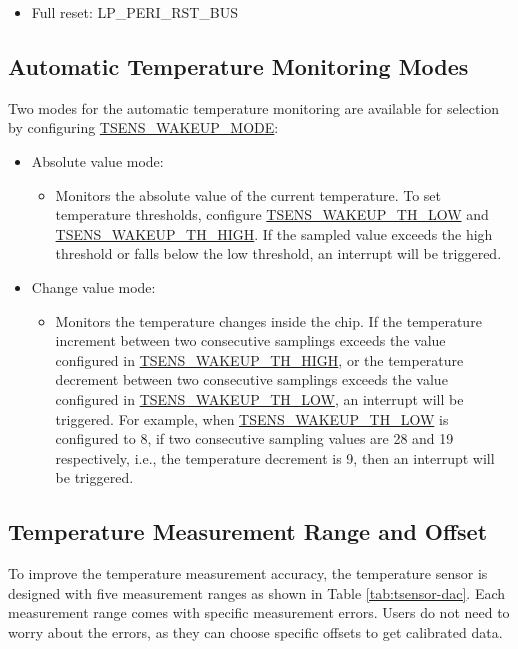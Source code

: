 \documentclass[main\_\_EN.tex]{subfiles}
\begin{document}
\begin{itemize}
    \item Full reset: LP\_PERI\_RST\_BUS
\end{itemize}

\subsection{Automatic Temperature Monitoring Modes}

Two modes for the automatic temperature monitoring are available for selection by configuring \hyperref[fielddesc:TSENSWAKEUPMODE]{TSENS\_WAKEUP\_MODE}:

\begin{itemize}
    \item Absolute value mode:
        \begin{itemize}
            \item Monitors the absolute value of the current temperature. To set temperature thresholds, configure \hyperref[fielddesc:TSENSWAKEUPTHLOW]{TSENS\_WAKEUP\_TH\_LOW} and \hyperref[fielddesc:TSENSWAKEUPTHHIGH]{TSENS\_WAKEUP\_TH\_HIGH}. If the sampled value exceeds the high threshold or falls below the low threshold, an interrupt will be triggered.
        \end{itemize}
    \item Change value mode:
        \begin{itemize}
            \item Monitors the temperature changes inside the chip. If the temperature increment between two consecutive samplings exceeds the value configured in \hyperref[fielddesc:TSENSWAKEUPTHHIGH]{TSENS\_WAKEUP\_TH\_HIGH}, or the temperature decrement between two consecutive samplings exceeds the value configured in \hyperref[fielddesc:TSENSWAKEUPTHLOW]{TSENS\_WAKEUP\_TH\_LOW}, an interrupt will be triggered. For example, when \hyperref[fielddesc:TSENSWAKEUPTHLOW]{TSENS\_WAKEUP\_TH\_LOW} is configured to 8, if two consecutive sampling values are 28 and 19 respectively, i.e., the temperature decrement is 9, then an interrupt will be triggered.
        \end{itemize}
\end{itemize}

\subsection{Temperature Measurement Range and Offset}

To improve the temperature measurement accuracy, the temperature sensor is designed with five measurement ranges as shown in Table \ref{tab:tsensor-dac}. Each measurement range comes with specific measurement errors. Users do not need to worry about the errors, as they can choose specific offsets to get calibrated data.
\end{document}
